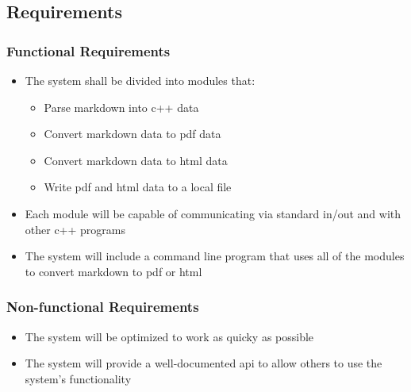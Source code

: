 \subsection{Requirements}

\subsubsection{Functional Requirements}

\begin{itemize}
	\item The system shall be divided into modules that:
		\begin{itemize}
			\item Parse markdown into c++ data
			\item Convert markdown data to pdf data
			\item Convert markdown data to html data
			\item Write pdf and html data to a local file
		\end{itemize}
	\item Each module will be capable of communicating via standard in/out and with other c++ programs
	\item The system will include a command line program that uses all of the modules to convert markdown to pdf or html
\end{itemize}

\subsubsection{Non-functional Requirements}
\begin{itemize}
	\item The system will be optimized to work as quicky as possible
	\item The system will provide a well-documented api to allow others to use the system's functionality
\end{itemize}
